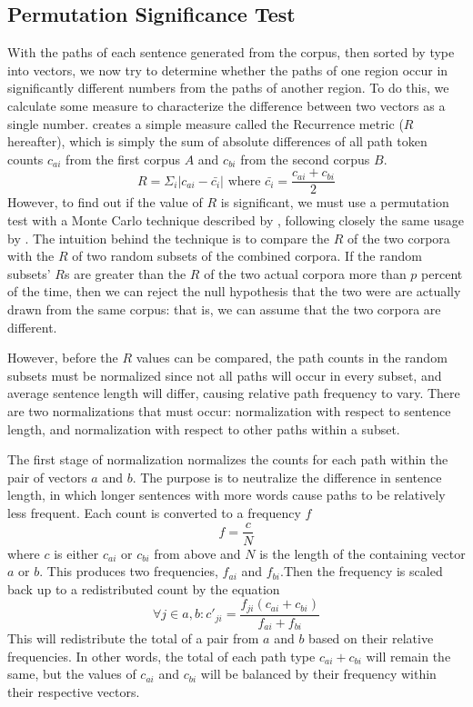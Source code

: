 \documentclass[11pt,letterpaper]{article}
\begin{document}
\subsection{Permutation Significance Test}

With the paths of each sentence generated from the corpus, then sorted
by type into vectors, we now try to determine
whether the paths of one region occur in significantly different
numbers from the paths of another region. To do this, we calculate some
measure to characterize the difference between two vectors as a single
number.  creates a simple measure called the
{\sc Recurrence} metric ($R$ hereafter), which
is simply the sum of absolute differences of all path token counts
$c_{ai}$ from the first corpus $A$ and $c_{bi}$ from the second corpus
$B$.
\[ R = \Sigma_i |c_{ai} - \bar{c_i}| \textrm{ where } \bar{c_i} = \frac{c_{ai} + c_{bi}}{2}\]
However, to find out if the value of $R$ is significant, we
must use a permutation test with a Monte Carlo technique described by
, following
closely the same usage by . The intuition behind
the technique is to compare the $R$ of the two corpora with the $R$ of
two random subsets of the combined corpora. If the random subsets' $R$s
are greater than the $R$ of the two actual corpora more than $p$ percent
of the time, then we can reject the null hypothesis that the two were
are actually drawn from the same corpus: that is, we can assume that
the two corpora are different.

However, before the $R$ values can be compared, the path counts in the
random subsets must
be normalized since not all paths will occur in every subset, and
average sentence length will differ, causing relative path frequency
to vary. There are two normalizations that must occur: normalization
with respect to sentence length, and
normalization with respect to other paths within a subset.

The first stage of normalization normalizes the counts for each path
within the pair of vectors $a$ and $b$. The purpose is to neutralize the
difference in sentence length, in which longer sentences with more
words cause paths to be relatively less frequent.
Each count is converted to a frequency $f$ \[f=\frac{c}{N} \] where
$c$ is either $c_{ai}$ or $c_{bi}$ from above and $N$ is the length of the
containing vector $a$ or $b$. This produces two frequencies, $f_{ai}$ and
$f_{bi}$.Then the frequency is scaled
back up to a redistributed count by the equation
\[\forall j \in a,b : c'_{ji} = \frac{f_{ji}(c_{ai}+c_{bi})}{f_{ai}+f_{bi}}\]
This will redistribute the total of a pair from $a$ and $b$ based on
their relative frequencies. In other words, the total of each path
type $c_{ai} + c_{bi}$ will remain the same, but the values of
$c_{ai}$ and $c_{bi}$ will be balanced by their frequency
within their respective vectors.
\end{document}
